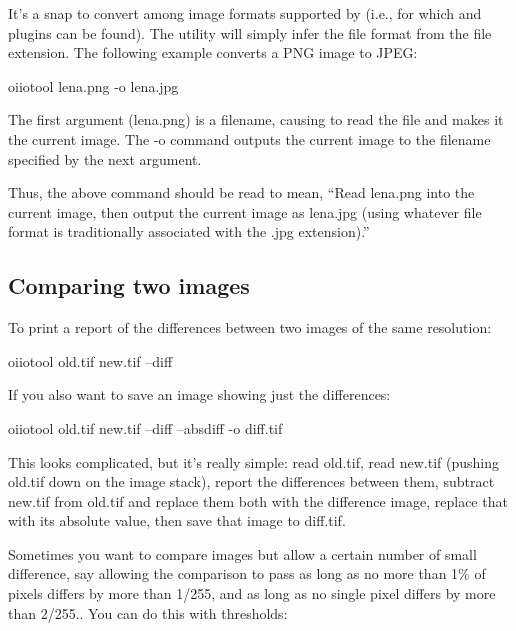 It's a snap to convert among image formats supported by \product
(i.e., for which \ImageInput and \ImageOutput plugins can be found).
The \oiiotool utility will simply infer the file format from the
file extension. The following example converts a PNG image to JPEG:

\begin{code}
    oiiotool lena.png -o lena.jpg
\end{code}

The first argument ({\cf lena.png}) is a filename, causing \oiiotool to
read the file and makes it the current image.  The {\cf -o} command
outputs the current image to the filename specified by the next
argument.

Thus, the above command should be read to mean, ``Read {\cf lena.png}
into the current image, then output the current image as {\cf lena.jpg}
(using whatever file format is traditionally associated with the {\cf
  .jpg} extension).''


\subsection*{Comparing two images}

To print a report of the differences between two images of the same
resolution: 

\begin{code}
    oiiotool old.tif new.tif --diff
\end{code}

\noindent If you also want to save an image showing just the differences:

\begin{code}
    oiiotool old.tif new.tif --diff --absdiff -o diff.tif
\end{code}

This looks complicated, but it's really simple: read {\cf old.tif},
read {\cf new.tif} (pushing {\cf old.tif} down on the image stack),
report the differences between them, subtract {\cf new.tif} from 
{\cf old.tif} and replace them both with the difference image,
replace that with its absolute value, then save that image to 
{\cf diff.tif}.

Sometimes you want to compare images but allow a certain number of small
difference, say allowing the comparison to pass as long as no more than
1\% of pixels differs by more than 1/255, and as long as no single pixel
differs by more than 2/255.. You can do this with thresholds:

